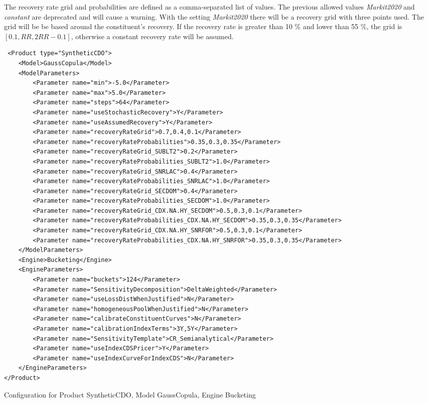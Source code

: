 The recovery rate grid and probabilities are defined as a comma-separated list of values. The previous allowed values \emph{Markit2020} and \emph{constant} are deprecated and 
will cause a warning. With the setting \emph{Markit2020} there will be a recovery grid with three points used. The grid will be be based around the constituent's recovery. If the recovery rate 
is greater than 10 \% and lower than 55 \%,  the grid is $[0.1, RR, 2 RR - 0.1]$, otherwise a constant recovery rate will be assumed.

\begin{longlisting}
\begin{verbatim}
 <Product type="SyntheticCDO">
    <Model>GaussCopula</Model>
    <ModelParameters>
        <Parameter name="min">-5.0</Parameter>
        <Parameter name="max">5.0</Parameter>
        <Parameter name="steps">64</Parameter>
        <Parameter name="useStochasticRecovery">Y</Parameter>
        <Parameter name="useAssumedRecovery">Y</Parameter>
        <Parameter name="recoveryRateGrid">0.7,0.4,0.1</Parameter>
        <Parameter name="recoveryRateProbabilities">0.35,0.3,0.35</Parameter>
        <Parameter name="recoveryRateGrid_SUBLT2">0.2</Parameter>
        <Parameter name="recoveryRateProbabilities_SUBLT2">1.0</Parameter>
        <Parameter name="recoveryRateGrid_SNRLAC">0.4</Parameter>
        <Parameter name="recoveryRateProbabilities_SNRLAC">1.0</Parameter>
        <Parameter name="recoveryRateGrid_SECDOM">0.4</Parameter>
        <Parameter name="recoveryRateProbabilities_SECDOM">1.0</Parameter>
        <Parameter name="recoveryRateGrid_CDX.NA.HY_SECDOM">0.5,0.3,0.1</Parameter>
        <Parameter name="recoveryRateProbabilities_CDX.NA.HY_SECDOM">0.35,0.3,0.35</Parameter>
        <Parameter name="recoveryRateGrid_CDX.NA.HY_SNRFOR">0.5,0.3,0.1</Parameter>
        <Parameter name="recoveryRateProbabilities_CDX.NA.HY_SNRFOR">0.35,0.3,0.35</Parameter>
    </ModelParameters>
    <Engine>Bucketing</Engine>
    <EngineParameters>
        <Parameter name="buckets">124</Parameter>
        <Parameter name="SensitivityDecomposition">DeltaWeighted</Parameter>
        <Parameter name="useLossDistWhenJustified">N</Parameter>
        <Parameter name="homogeneousPoolWhenJustified">N</Parameter>
        <Parameter name="calibrateConstituentCurves">N</Parameter>
        <Parameter name="calibrationIndexTerms">3Y,5Y</Parameter>
        <Parameter name="SensitivityTemplate">CR_Semianalytical</Parameter>
        <Parameter name="useIndexCDSPricer">Y</Parameter>
        <Parameter name="useIndexCurveForIndexCDS">N</Parameter>
    </EngineParameters>
</Product>
\end{verbatim}
\caption{Configuration for Product SyntheticCDO, Model GaussCopula, Engine Bucketing}
\label{lst:peconfig_SyntheticCDO_GaussCopula_Bucketing}
\end{longlisting}

